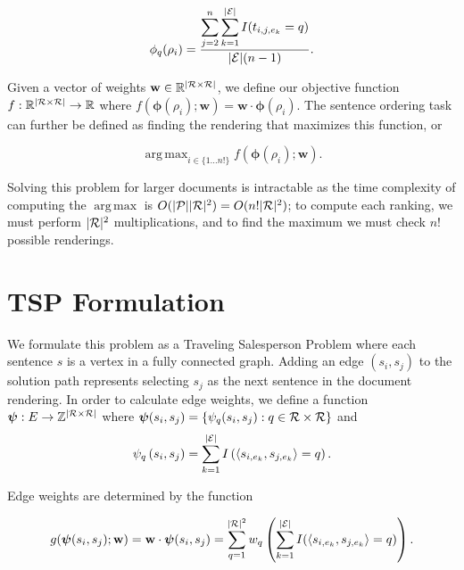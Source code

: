 \documentclass{article}
\newcommand{\entities}{{\cal E}}
\newcommand{\ent}{e}
\newcommand{\roles}{{\cal R}}
\newcommand{\tv}{t}
\newcommand{\sent}{s}
\newcommand{\weight}{\mathbf{w}}
\newcommand{\rend}{\rho}
\newcommand{\Rend}{{\cal P}}
\newcommand{\trans}{q}
\newcommand{\obj}{f}
\newcommand{\EnumS}[2]{\{#1 \ldots #2\}}
\DeclareMathOperator*{\argmax}{arg\,max}
\newcommand{\fmap}{\boldsymbol{\phi}}
\newcommand{\edgeTot}{\boldsymbol{\psi}}
\begin{document}
\begin{equation}
\phi_\trans(\rend_i) = \frac{ \displaystyle \sum_{j = 2}^n \sum_{k=1}^{|\entities|} I(\tv_{i,j,e_k}= \trans)  }{|\entities|(n-1)}. 
\end{equation}


Given a vector of weights $\mathbf{w} \in \mathbb{R}^{|\roles\times\roles|}$, we define our objective function $\obj : \mathbb{R}^{|\roles\times\roles|}  \rightarrow \mathbb{R}$ where $\obj(\fmap(\rend_i);\weight) = \weight\cdot\fmap(\rend_i)$. 
The sentence ordering task can further be defined as finding the rendering that maximizes this function, or

\begin{equation}
    \argmax_{i \in \EnumS{1}{n!}} \obj(\boldsymbol{\phi}(\rend_i) ; \weight ).
\end{equation}


Solving this problem for larger documents is intractable as the time complexity of computing the $\argmax$ is $ O(|\Rend||\roles|^2) = O(n!|\roles|^2)$; to compute each ranking, we must perform $|\roles|^2$ multiplications, and to find the maximum we must check $n!$ possible renderings.

\section{TSP Formulation}
We formulate this problem as a Traveling Salesperson Problem where each sentence $\sent$ is a vertex in a fully connected graph. 
Adding an edge $(\sent_i,\sent_j)$ to the solution path represents selecting $\sent_j$ as the next sentence in the document rendering.
In order to calculate edge weights, we define a function $\edgeTot : E \rightarrow \mathbb{Z}^{|\roles \times \roles|}  $ where $\edgeTot(s_i,s_j) = \{ \psi_\trans(s_i,s_j) : \trans \in {\roles \times \roles } \}$ and 
\begin{equation}
    \psi_\trans\left( s_i,s_j \right) = \displaystyle \sum_{k=1}^{|\entities|} I\left( \langle s_{i,\ent_k},s_{j,\ent_k} \rangle = \trans\right) . 
\end{equation}

Edge weights are determined by the function

\begin{equation}
    g(\edgeTot(\sent_i,\sent_j );\weight) = \weight\cdot \edgeTot(\sent_i, \sent_j) = \sum^{|\roles|^2}_{q=1} w_\trans \left( \sum_{k = 1}^{|\entities|} I(\langle \sent_{i,\ent_k},\sent_{j,\ent_k}\rangle = \trans) \right).
\end{equation}
\end{document}
